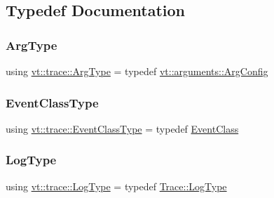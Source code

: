 \subsection{Typedef Documentation}
\mbox{\label{namespacevt_1_1trace_ac55854009908dbec57de1f2f974c36e8}} 
\subsubsection{\texorpdfstring{Arg\+Type}{ArgType}}
{\footnotesize\ttfamily using \hyperlink{namespacevt_1_1trace_ac55854009908dbec57de1f2f974c36e8}{vt\+::trace\+::\+Arg\+Type} = typedef \hyperlink{structvt_1_1arguments_1_1_arg_config}{vt\+::arguments\+::\+Arg\+Config}}

\mbox{\label{namespacevt_1_1trace_afc5456ac95b0d3e9bb63a21597f5660c}} 
\subsubsection{\texorpdfstring{Event\+Class\+Type}{EventClassType}}
{\footnotesize\ttfamily using \hyperlink{namespacevt_1_1trace_afc5456ac95b0d3e9bb63a21597f5660c}{vt\+::trace\+::\+Event\+Class\+Type} = typedef \hyperlink{structvt_1_1trace_1_1_event_class}{Event\+Class}}

\mbox{\label{namespacevt_1_1trace_abf816ddd3c20f0f8d974662f373b088d}} 
\subsubsection{\texorpdfstring{Log\+Type}{LogType}}
{\footnotesize\ttfamily using \hyperlink{namespacevt_1_1trace_abf816ddd3c20f0f8d974662f373b088d}{vt\+::trace\+::\+Log\+Type} = typedef \hyperlink{structvt_1_1trace_1_1_trace_a43306d96a91e49db081eaea016f1dd0a}{Trace\+::\+Log\+Type}}

\mbox{\label{namespacevt_1_1trace_a352c8799ee88afa3f1b7008952ed8485}} 
